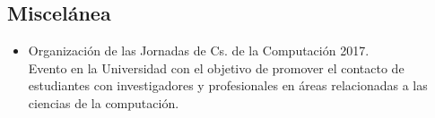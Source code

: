\documentclass[10pt,a4paper]{moderncv}        %
\begin{document}
  \subsection{Miscelánea}
    \begin{itemize}
      \item Organizaci\'on de las Jornadas de Cs. de la Computaci\'on 2017. \\
       Evento en la Universidad con el objetivo de promover el contacto de estudiantes con investigadores
       y profesionales en \'areas relacionadas a las ciencias de la computaci\'on.
    \end{itemize}

\end{document}
